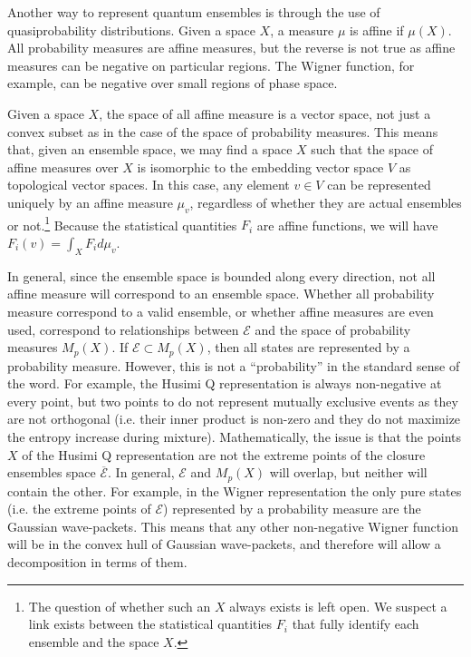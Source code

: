 \documentclass[10pt,twocolumn, nofootinbib]{revtex4-2}
\newcommand{\Ens}[1][E] {\mathcal{#1}} %
\begin{document}
Another way to represent quantum ensembles is through the use of quasiprobability distributions. Given a space $X$, a measure $\mu$ is affine if $\mu(X)$. All probability measures are affine measures, but the reverse is not true as affine measures can be negative on particular regions. The Wigner function, for example, can be negative over small regions of phase space.

Given a space $X$, the space of all affine measure is a vector space, not just a convex subset as in the case of the space of probability measures. This means that, given an ensemble space, we may find a space $X$ such that the space of affine measures over $X$ is isomorphic to the embedding vector space $V$ as topological vector spaces. In this case, any element $v\in V$ can be represented uniquely by an affine measure $\mu_{v}$, regardless of whether they are actual ensembles or not.\footnote{The question of whether such an $X$ always exists is left open. We suspect a link exists between the statistical quantities $F_i$ that fully identify each ensemble and the space $X$.} Because the statistical quantities $F_i$ are affine functions, we will have $F_i(v) = \int_X F_i d\mu_{v}$.

In general, since the ensemble space is bounded along every direction, not all affine measure will correspond to an ensemble space. Whether all probability measure correspond to a valid ensemble, or whether affine measures are even used, correspond to relationships between $\Ens$ and the space of probability measures $M_p(X)$. If $\Ens \subset M_p(X)$, then all states are represented by a probability measure. However, this is not a ``probability'' in the standard sense of the word. For example, the Husimi Q representation is always non-negative at every point, but two points to do not represent mutually exclusive events as they are not orthogonal (i.e. their inner product is non-zero and they do not maximize the entropy increase during mixture). Mathematically, the issue is that the points $X$ of the Husimi Q representation are not the extreme points of the closure ensembles space $\overline{\Ens}$. In general, $\Ens$ and $M_p(X)$ will overlap, but neither will contain the other. For example, in the Wigner representation the only pure states (i.e. the extreme points of $\Ens$) represented by a probability measure are the Gaussian wave-packets. This means that any other non-negative Wigner function will be in the convex hull of Gaussian wave-packets, and therefore will allow a decomposition in terms of them.
\end{document}
